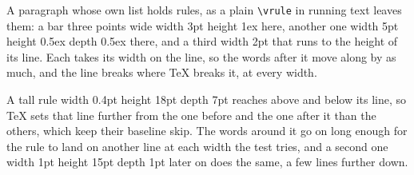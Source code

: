 \documentclass{article}
\begin{document}
A paragraph whose own list holds rules, as a plain \verb|\vrule| in running
text leaves them: a bar three points wide \vrule width 3pt height 1ex\relax{}
here, another one \vrule width 5pt height 0.5ex depth 0.5ex\relax{} there, and
a third \vrule width 2pt\relax{} that runs to the height of its line. Each
takes its width on the line, so the words after it move along by as much,
and the line breaks where TeX breaks it, at every width.

A tall rule \vrule width 0.4pt height 18pt depth 7pt\relax{} reaches above
and below its line, so TeX sets that line further from the one before and
the one after it than the others, which keep their baseline skip. The
words around it go on long enough for the rule to land on another line at
each width the test tries, and a second one \vrule width 1pt height 15pt
depth 1pt\relax{} later on does the same, a few lines further down.
\end{document}
